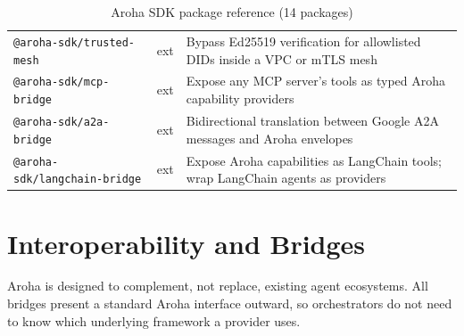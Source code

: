 \documentclass[11pt,a4paper]{article}
\begin{document}
\begin{table}[ht]
\begin{tabularx}{\textwidth}{@{} l l X @{}}
    \texttt{@aroha-sdk/trusted-mesh}     & ext  & Bypass Ed25519 verification for allowlisted DIDs inside a VPC or mTLS mesh \\
    \texttt{@aroha-sdk/mcp-bridge}       & ext  & Expose any MCP server's tools as typed Aroha capability providers \\
    \texttt{@aroha-sdk/a2a-bridge}       & ext  & Bidirectional translation between Google A2A messages and Aroha envelopes \\
    \texttt{@aroha-sdk/langchain-bridge} & ext  & Expose Aroha capabilities as LangChain tools; wrap LangChain agents as providers \\
    \bottomrule
  \end{tabularx}
  \caption{Aroha SDK package reference (14 packages)}
\end{table}

\section{Interoperability and Bridges}

Aroha is designed to complement, not replace, existing agent ecosystems. All bridges
present a standard Aroha interface outward, so orchestrators do not need to know which
underlying framework a provider uses.
\end{document}
